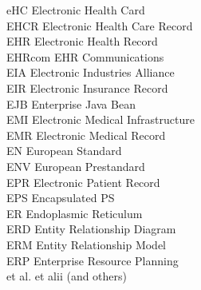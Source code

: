 \begin{tabbing}

    \>eHC \>\>Electronic Health Card\\

    \>EHCR \>\>Electronic Health Care Record\\

    \>EHR \>\>Electronic Health Record\\

    \>EHRcom \>\>EHR Communications\\

    \>EIA \>\>Electronic Industries Alliance\\


    \>EIR \>\>Electronic Insurance Record\\

    \>EJB \>\>Enterprise Java Bean\\


    \>EMI \>\>Electronic Medical Infrastructure\\

    \>EMR \>\>Electronic Medical Record\\

    \>EN \>\>European Standard\\

    \>ENV \>\>European Prestandard\\


    \>EPR \>\>Electronic Patient Record\\

    \>EPS \>\>Encapsulated PS\\

    \>ER \>\>Endoplasmic Reticulum\\

    \>ERD \>\>Entity Relationship Diagram\\

    \>ERM \>\>Entity Relationship Model\\

    \>ERP \>\>Enterprise Resource Planning\\

    \>et al. \>\>et alii (and others)\\


\end{tabbing}
